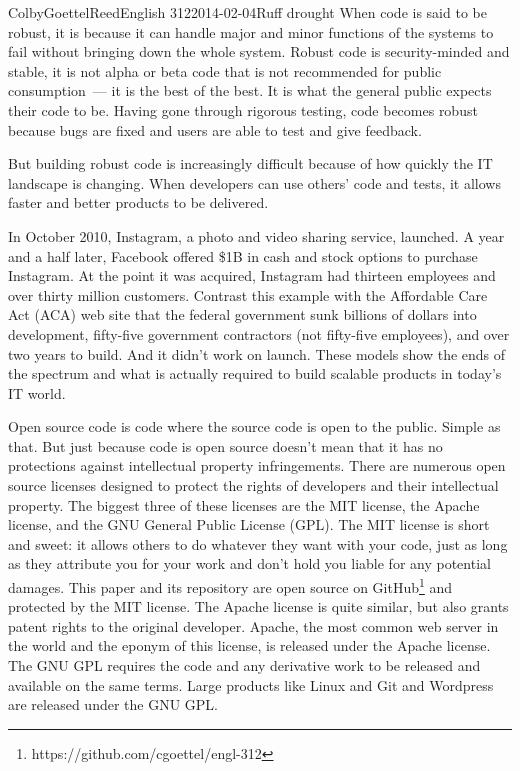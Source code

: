 \documentclass[12pt]{article}
\begin{document}
\begin{mla}{Colby}{Goettel}{Reed}{English 312}{2014-02-04}{Ruff drought}
When code is said to be robust, it is because it can handle major and minor functions of the systems to fail without bringing down the whole system. Robust code is security-minded and stable, it is not alpha or beta code that is not recommended for public consumption~--- it is the best of the best. It is what the general public expects their code to be. Having gone through rigorous testing, code becomes robust because bugs are fixed and users are able to test and give feedback.

But building robust code is increasingly difficult because of how quickly the IT landscape is changing. When developers can use others' code and tests, it allows faster and better products to be delivered.

In October 2010, Instagram, a photo and video sharing service, launched. A year and a half later, Facebook offered \$1B in cash and stock options to purchase Instagram. At the point it was acquired, Instagram had thirteen employees and over thirty million customers. Contrast this example with the Affordable Care Act (ACA) web site that the federal government sunk billions of dollars into development, fifty-five government contractors (not fifty-five employees), and over two years to build. And it didn't work on launch. These models show the ends of the spectrum and what is actually required to build scalable products in today's IT world.

Open source code is code where the source code is open to the public. Simple as that. But just because code is open source doesn't mean that it has no protections against intellectual property infringements. There are numerous open source licenses designed to protect the rights of developers and their intellectual property. The biggest three of these licenses are the MIT license, the Apache license, and the GNU General Public License (GPL). The MIT license is short and sweet: it allows others to do whatever they want with your code, just as long as they attribute you for your work and don't hold you liable for any potential damages. This paper and its repository are open source on GitHub\footnote{https://github.com/cgoettel/engl-312} and protected by the MIT license. The Apache license is quite similar, but also grants patent rights to the original developer. Apache, the most common web server in the world and the eponym of this license, is released under the Apache license. The GNU GPL requires the code and any derivative work to be released and available on the same terms. Large products like Linux and Git and Wordpress are released under the GNU GPL.


\end{mla}
\end{document}
